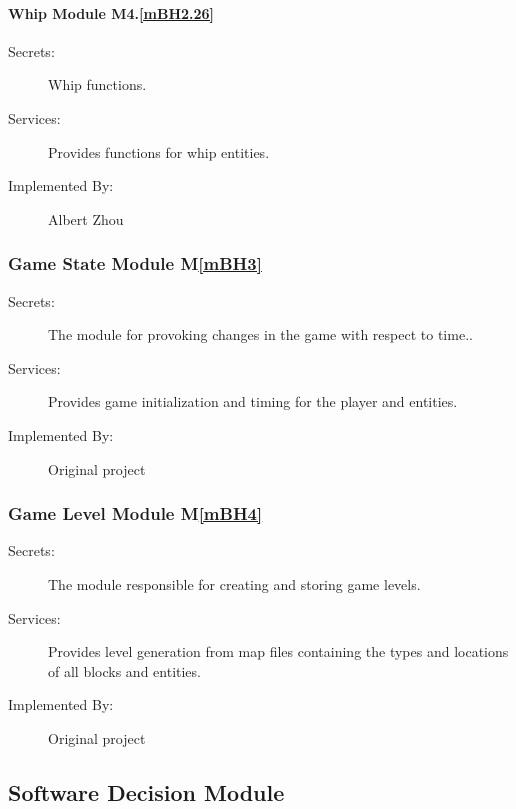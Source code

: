 \documentclass[12pt, titlepage]{article}
\newcommand{\mref}[1]{M\ref{#1}}
\begin{document}
{\paragraph{Whip Module M4.\ref{mBH2.26}}
\begin{description}
\item[Secrets:] Whip functions.
\item[Services:] Provides functions for whip entities. 
\item[Implemented By:] Albert Zhou
\end{description}
}

\subsubsection{Game State Module \mref{mBH3}}

\begin{description}
\item[Secrets:] The module for provoking changes in the game with respect to time..
\item[Services:] Provides game initialization and timing for the player and entities.
\item[Implemented By:] Original project
\end{description}

\subsubsection{Game Level Module \mref{mBH4}}

\begin{description}
\item[Secrets:] The module responsible for creating and storing game levels.
\item[Services:] Provides level generation from map files containing the types and locations of all blocks and entities.
\item[Implemented By:] Original project
\end{description}


\subsection{Software Decision Module}

\end{document}
